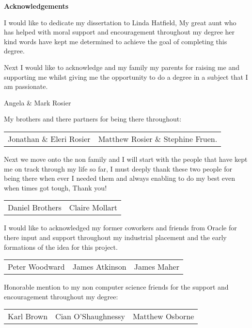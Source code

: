 \thispagestyle{empty}

\begin{center}
{\LARGE\bf Acknowledgements}

I would like to dedicate my dissertation to Linda Hatfield, My great aunt who has helped with moral support and encouragement throughout my degree her kind words have kept me determined to achieve the goal of completing this degree.

Next I would like to acknowledge and my family my parents for raising me and supporting me whilst giving me the opportunity to do a degree in a subject that I am passionate.

Angela \& Mark Rosier

My brothers and there partners for being there throughout:

\begin{tabular}{ l r }
Jonathan \& Eleri Rosier & Matthew Rosier \& Stephine Fruen.\\
\end{tabular}

\vspace{4mm}

Next we move onto the non family and I will start with the people that have kept me on track through my life so far, I must deeply thank these two people for being there when ever I needed them and always enabling to do my best even when times got tough, Thank you!

\begin{tabular}{ l r }
Daniel Brothers & Claire Mollart\\
\end{tabular}

\vspace{4mm}

I would like to acknowledged my former coworkers and friends from Oracle for there input and support throughout my industrial placement and the early formations of the idea for this project.

\begin{tabular}{ l c r }
Peter Woodward & James Atkinson & James Maher\\
\end{tabular}

\vspace{4mm}

Honorable mention to my non computer science friends for the support and encouragement throughout my degree:

\begin{tabular}{ l c r }
Karl Brown & Cian O'Shaughnessy & Matthew Osborne\\
\end{tabular}


\end{center}
